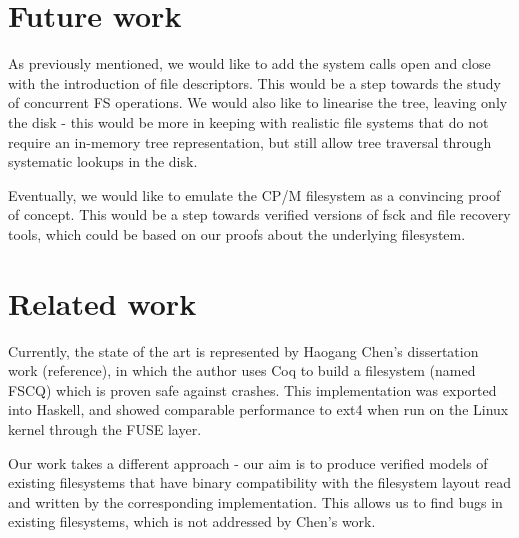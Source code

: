 \documentclass[format=sigconf,review=true]{acmart}
\begin{document}
\section{Future work}
As previously mentioned, we would like to add the system calls open and close with the
introduction of file descriptors. This would be a step towards the
study of concurrent FS operations. We would also like to linearise
the tree, leaving only the disk - this would be more in keeping
with realistic file systems that do not require an in-memory tree
representation, but still allow tree traversal through systematic
lookups in the disk.

Eventually, we would like to emulate the CP/M filesystem as a convincing proof
of concept. This would be a step towards verified versions of fsck
and file recovery tools, which could be based on our proofs about
the underlying filesystem.

\section{Related work}
Currently, the state of the art is represented by Haogang
Chen's dissertation work (reference), in which the author uses Coq to
build a filesystem (named FSCQ) which is proven safe against
crashes. This implementation was exported into Haskell, and showed
comparable performance to ext4 when run on the Linux kernel
through the FUSE layer.

Our work takes a different approach - our aim is to produce verified
models of existing filesystems that have binary compatibility with the
filesystem layout read and written by the corresponding
implementation. This allows us to find bugs in existing filesystems,
which is not addressed by Chen's work.
\end{document}
